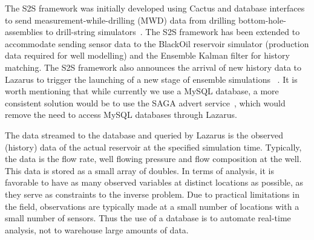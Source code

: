 \documentclass{acm_proc_article-sp}
\newcommand{\jhanote}[1]{ {\textcolor{red} { ***Jha: #1 }}}
\newcommand{\yyenote}[1]{ {\textcolor{blue} { ***yye00: #1 }}}
\newcommand{\jhanote}[1]{}
\newcommand{\yyenote}[1]{}
\begin{document}
The S2S framework was initially developed using Cactus and database
interfaces to send measurement-while-drilling (MWD) data from drilling
bottom-hole-assemblies to drill-string simulators~\cite{Duff1,
  Duff2}. The S2S framework has been extended to accommodate sending
sensor data to the BlackOil reservoir simulator (production data
required for well modelling) and the Ensemble Kalman filter for
history matching.  The S2S framework also announces the arrival of new
history data to Lazarus to trigger the launching of a new stage of
ensemble simulations ~\cite{Duff1,Duff2}.  It is worth mentioning that
while currently we use a MySQL database, a more consistent solution
would be to use the SAGA advert service~\cite{saga_sc05}, which would
remove the need to access MySQL databases through Lazarus.

The data streamed to the database and queried by Lazarus is the observed
(history) data of the actual reservoir at the specified simulation time. Typically,
the data is the flow rate, well flowing pressure and flow composition
at the well. This data is stored as a small array of doubles.
In terms of analysis, it is favorable to have as many observed variables
at distinct locations as possible, as they serve as constraints to the inverse
problem. Due to practical limitations in the field, observations are typically made at a
small number of locations with a small number of sensors. Thus the use
of a database is to automate real-time analysis, not to warehouse large amounts of data.



\end{document}

